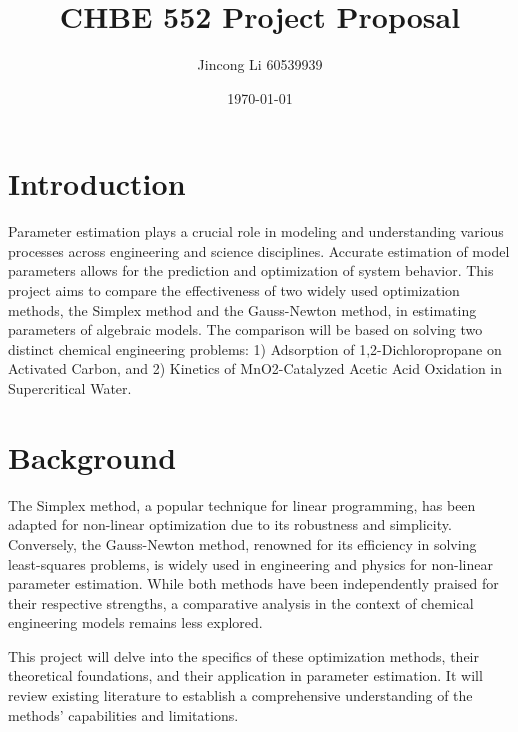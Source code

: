 \documentclass[a4paper,12pt]{article} %
\begin{document}
\setlength{\parskip}{1em} 
\setlength{\parindent}{0pt}
\newcommand{\vect}[1]{\mathbf{#1}}

\title{CHBE 552 Project Proposal}
\author{Jincong Li 60539939}
\date{\today}
\maketitle


\section*{Introduction}
Parameter estimation plays a crucial role in modeling and understanding various processes across engineering and science disciplines. Accurate estimation of model parameters allows for the prediction and optimization of system behavior. This project aims to compare the effectiveness of two widely used optimization methods, the Simplex method and the Gauss-Newton method, in estimating parameters of algebraic models. The comparison will be based on solving two distinct chemical engineering problems: 1) Adsorption of 1,2-Dichloropropane on Activated Carbon, and 2) Kinetics of MnO2-Catalyzed Acetic Acid Oxidation in Supercritical Water.

\section*{Background}
The Simplex method, a popular technique for linear programming, has been adapted for non-linear optimization due to its robustness and simplicity. Conversely, the Gauss-Newton method, renowned for its efficiency in solving least-squares problems, is widely used in engineering and physics for non-linear parameter estimation. While both methods have been independently praised for their respective strengths, a comparative analysis in the context of chemical engineering models remains less explored.

This project will delve into the specifics of these optimization methods, their theoretical foundations, and their application in parameter estimation. It will review existing literature to establish a comprehensive understanding of the methods' capabilities and limitations.
\end{document}
